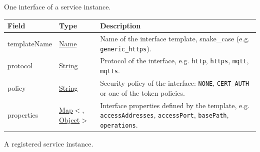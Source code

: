 \documentclass[a4paper]{arrowhead}
\newcommand{\pref}[1]{{\textcolor{ArrowheadGrey}{\hyperref[sec:model:primitives:#1]{#1}}}}
\begin{document}

One interface of a service instance.


\noindent\begin{tabularx}{\textwidth}{| >{\raggedright\arraybackslash}p{3.9cm} | >{\raggedright\arraybackslash\small}p{5.3cm} | X |} \hline
\rowcolor{gray!33} Field & Type & Description \\ \hline
template\allowbreak{}Name & \pref{Name} & Name of the interface template, snake\_case (e.g. \texttt{generic\_\allowbreak{}https}). \\ \hline
protocol & \pref{String} & Protocol of the interface, e.g. \texttt{http}, \texttt{https}, \texttt{mqtt}, \texttt{mqtts}. \\ \hline
policy & \pref{String} & Security policy of the interface: \texttt{NONE}, \texttt{CERT\_\allowbreak{}AUTH} or one of the token policies. \\ \hline
properties & \pref{Map}$<$\allowbreak{}\pref{String}, \pref{Object}$>$ & Interface properties defined by the template, e.g. \texttt{accessAddresses}, \texttt{accessPort}, \texttt{basePath}, \texttt{operations}. \\ \hline
\end{tabularx}




A registered service instance.
\end{document}
